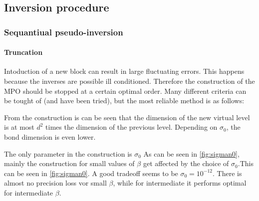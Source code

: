 \subsection{Inversion procedure}

\subsubsection{Sequantiual pseudo-inversion}


\paragraph{Truncation}

Intoduction of a new block can result in large fluctuating errors. This happens because the inverses are possible ill conditioned. Therefore the construction of the MPO should be stopped at a certain optimal order. Many different criteria can be tought of (and have been tried), but the most reliable method is as follows:

From the construction is can be seen that  the dimension of the new virtual level is at most $d^2$ times the dimension of the previous level. Depending on $\sigma_0$, the bond dimension is even lower.

The only parameter in the construction is $\sigma_0$ As can be seen in \cref{fig:sigman0}, mainly the construction for small values of $\beta$ get affected by the choice of $\sigma_0$.This can be seen in \cref{fig:sigman0}. A good tradeoff seems to be $ \sigma_0 = {10}^{-12}$. There is almost no precision loss vor small $\beta$, while for intermediate it performs optimal for intermediate $\beta$.

